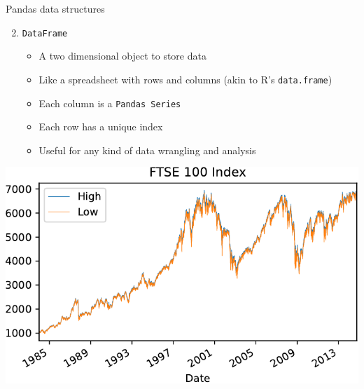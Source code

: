\documentclass[xcolor=table]{beamer}
\begin{document}
\begin{frame}{Pandas data structures}

\begin{enumerate}
	\setcounter{enumi}{1}
	\item \texttt{DataFrame}
	\begin{itemize}
		\item A two dimensional object to store data
		\item Like a spreadsheet with rows and columns (akin to R's \texttt{data.frame})
		\item Each column is a \texttt{Pandas Series}
		\item Each row has a unique index
		\item Useful for any kind of data wrangling and analysis
	\end{itemize}
\end{enumerate}

\begin{center}
	\includegraphics[width=.7\textwidth]{ftse2.pdf}
\end{center}

\end{frame}
\end{document}
